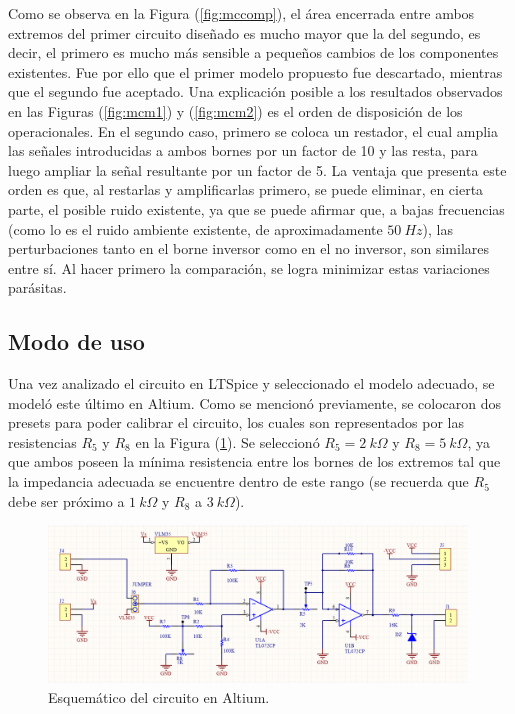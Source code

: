 \documentclass[a4paper]{article}
\begin{document}
Como se observa en la Figura (\ref{fig:mccomp}), el área encerrada entre ambos extremos del primer circuito diseñado es mucho mayor que la del segundo, es decir, el primero es mucho más sensible a pequeños cambios de los componentes existentes. Fue por ello que el primer modelo propuesto fue descartado, mientras que el segundo fue aceptado. 
Una explicación posible a los resultados observados en las Figuras (\ref{fig:mcm1}) y (\ref{fig:mcm2}) es el orden de disposición de los operacionales. En el segundo caso, primero se coloca un restador, el cual amplia las señales introducidas a ambos bornes por un factor de 10 y las resta, para luego ampliar la señal resultante por un factor de 5. La ventaja que presenta este orden es que, al restarlas y amplificarlas primero, se puede eliminar, en cierta parte, el posible ruido existente, ya que se puede afirmar que, a bajas frecuencias (como lo es el ruido ambiente existente, de aproximadamente $50 \ Hz$), las perturbaciones tanto en el borne inversor como en el no inversor, son similares entre sí. Al hacer primero la comparación, se logra minimizar estas variaciones parásitas.

\subsection{Modo de uso}

Una vez analizado el circuito en LTSpice y seleccionado el modelo adecuado, se modeló este último en Altium. Como se mencionó previamente, se colocaron dos presets para poder calibrar el circuito, los cuales son representados por las resistencias $R_5$ y $R_8$ en la Figura (\ref{fig:schematic}). Se seleccionó $R_5 = 2 \ k\Omega$ y $R_8 = 5 \ k\Omega$, ya que ambos poseen la mínima resistencia entre los bornes de los extremos tal que la impedancia adecuada se encuentre dentro de este rango (se recuerda que $R_5$ debe ser próximo a $ 1 \ k\Omega$ y $R_8$ a $ 3 \ k\Omega$).

\begin{figure}[H]
	\centering
	\includegraphics[width=0.99\textwidth]{Ejercicio6/Imagenes/Schematic.png}
	\caption{Esquemático del circuito en Altium.}
	\label{fig:schematic}
\end{figure}
\end{document}
